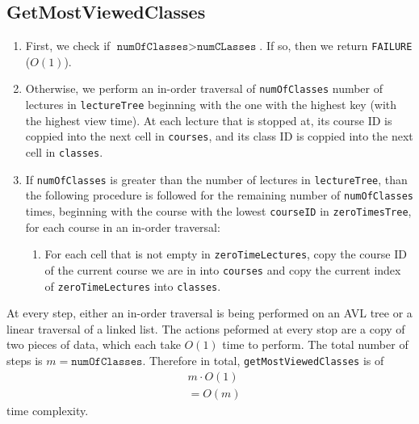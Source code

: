 \documentclass{article}
\begin{document}
    \subsection*{GetMostViewedClasses}
        \begin{enumerate}
            \item First, we check if $\texttt{numOfClasses}>\texttt{numCLasses}$.
                 If so, then we return \texttt{FAILURE} ($O(1)$).
            \item Otherwise, we perform an in-order traversal of \texttt{numOfClasses} number of lectures 
                in \texttt{lectureTree} beginning with the one with the highest key (with the highest view time).
                At each lecture that is stopped at, its course ID is coppied into the next cell in \texttt{courses},
                and its class ID is coppied into the next cell in \texttt{classes}.
            \item If \texttt{numOfClasses} is greater than the number of lectures in \texttt{lectureTree}, than the following
                procedure is followed for the remaining number of \texttt{numOfClasses} times, beginning with the course
                with the lowest \texttt{courseID} in \texttt{zeroTimesTree}, for each course in an in-order traversal:
                \begin{enumerate}
                    \item For each cell that is not empty in \texttt{zeroTimeLectures}, copy the course ID of the current
                        course we are in into \texttt{courses} and copy the current index of \texttt{zeroTimeLectures}
                        into \texttt{classes}.
                \end{enumerate}

        \end{enumerate}
    At every step, either an in-order traversal is being performed on an AVL tree or a linear traversal of 
    a linked list. The actions peformed at every stop are a copy of two pieces of data, which each take
    $O(1)$ time to perform. The total number of steps is $m=\texttt{numOfClasses}$. Therefore in total, \texttt{getMostViewedClasses} is of 
     \begin{align*}
         &m\cdot O(1)\\
         &=O(m)
     \end{align*}
     time complexity.
\end{document}
